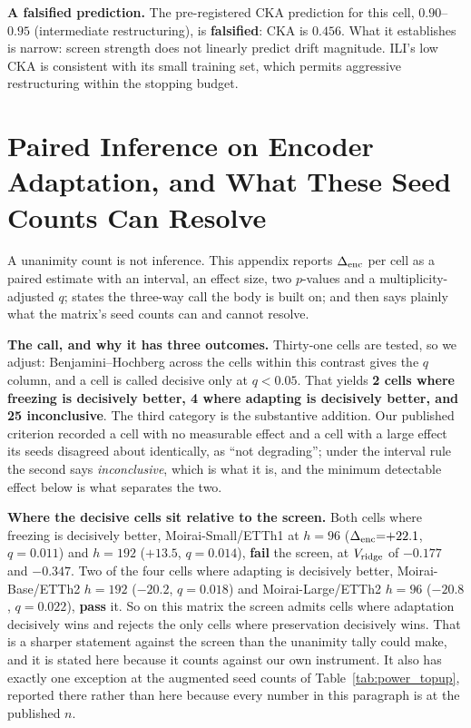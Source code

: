 \textbf{A falsified prediction.}  The pre-registered CKA prediction for this
cell, $0.90$--$0.95$ (intermediate restructuring), is \textbf{falsified}: CKA is
$0.456$.  What it establishes is narrow: screen strength does not linearly
predict drift magnitude.  ILI's low CKA is consistent with its small training set,
which permits aggressive restructuring within the stopping budget.

\section{Paired Inference on Encoder Adaptation, and What These Seed Counts Can
Resolve}
\label{app:pairedinference}

A unanimity count is not inference.  This appendix reports $\Delta_\text{enc}$ per cell as a
paired estimate with an interval, an effect size, two $p$-values and a
multiplicity-adjusted $q$; states the three-way call the body is built on; and
then says plainly what the matrix's seed counts can and cannot resolve.



\textbf{The call, and why it has three outcomes.}  Thirty-one cells are tested,
so we adjust: Benjamini--Hochberg across the cells within this contrast gives the
$q$ column, and a cell is called decisive only at $q{<}0.05$.  That yields
\textbf{2 cells where freezing is decisively better, 4 where adapting is
decisively better, and 25 inconclusive}.  The third category is the substantive
addition.  Our published criterion recorded a cell with no measurable effect and a
cell with a large effect its seeds disagreed about identically, as ``not
degrading''; under the interval rule the second says \emph{inconclusive}, which is
what it is, and the minimum detectable effect below is what separates the two.

\textbf{Where the decisive cells sit relative to the screen.}  Both cells where
freezing is decisively better, Moirai-Small/ETTh1 at $h{=}96$ ($\Delta_\text{enc}{=}{+}22.1$,
$q{=}0.011$) and $h{=}192$ ($+13.5$, $q{=}0.014$), \textbf{fail} the screen, at
$V_{\text{ridge}}$ of $-0.177$ and $-0.347$.  Two of the four cells where adapting
is decisively better, Moirai-Base/ETTh2 $h{=}192$ ($-20.2$, $q{=}0.018$) and
Moirai-Large/ETTh2 $h{=}96$ ($-20.8$, $q{=}0.022$), \textbf{pass} it.  So on this
matrix the screen admits cells where adaptation decisively wins and rejects the
only cells where preservation decisively wins.  That is a sharper statement against
the screen than the unanimity tally could make, and it is stated here because it
counts against our own instrument.  It also has exactly one exception at the augmented
seed counts of Table~\ref{tab:power_topup}, reported there rather than here because
every number in this paragraph is at the published $n$.

